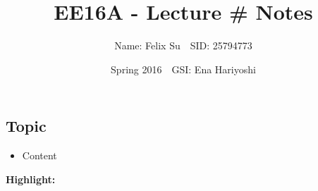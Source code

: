 \documentclass{article}\usepackage{amsmath,amssymb,amsthm,tikz,tkz-graph,color,chngpage,soul,hyperref,csquotes,graphicx,floatrow,framed,scrextend,mathrsfs}\newcommand*{\QEDB}{\hfill\ensuremath{\square}}\newtheorem*{prop}{Proposition}\renewcommand{\theenumi}{\alph{enumi}}\usepackage[shortlabels]{enumitem}\usepackage[nobreak=true]{mdframed}\usetikzlibrary{matrix,calc}\MakeOuterQuote{"}\usepackage[margin=0.75in]{geometry} \newtheorem{theorem}{Theorem}\newcommand{\Z}{\mathbb Z}\newcommand{\R}{\mathbb R}\newcommand{\Q}{\mathbb Q}\newcommand{\N}{\mathbb N}\newcommand{\x}[1]{\textrm{ #1 }}\newcommand{\pr}{\textrm{Pr}}
\title{EE16A - Lecture \# Notes}
\author{Name: Felix Su$\quad$SID: 25794773}
\date{Spring 2016$\quad$GSI: Ena Hariyoshi}
\begin{document}
\maketitle

\subsection*{Topic}
\begin{itemize}
    \item Content
\end{itemize}
\begin{mdframed}
\textbf{Highlight:}\\
\end{mdframed}
\end{document}
